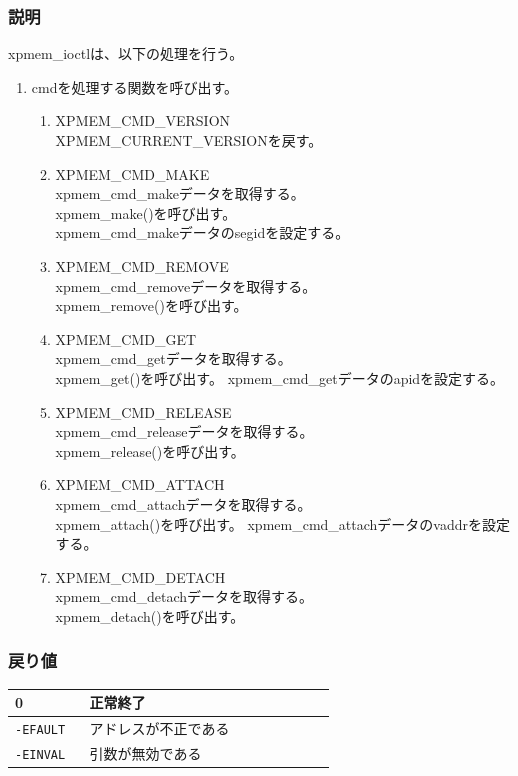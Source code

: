 \documentclass[twoside,11pt,fleqn]{book}
\begin{document}
\subsubsection*{説明}{\quad}
xpmem\_ioctlは、以下の処理を行う。
\begin{enumerate}
\item cmdを処理する関数を呼び出す。
  \begin{enumerate}
  \item XPMEM\_CMD\_VERSION\mbox{}\\
        XPMEM\_CURRENT\_VERSIONを戻す。
  \item XPMEM\_CMD\_MAKE\mbox{}\\
        xpmem\_cmd\_makeデータを取得する。\\
        xpmem\_make()を呼び出す。\\
        xpmem\_cmd\_makeデータのsegidを設定する。
  \item XPMEM\_CMD\_REMOVE\mbox{}\\
        xpmem\_cmd\_removeデータを取得する。\\
        xpmem\_remove()を呼び出す。
  \item XPMEM\_CMD\_GET\mbox{}\\
        xpmem\_cmd\_getデータを取得する。\\
        xpmem\_get()を呼び出す。
        xpmem\_cmd\_getデータのapidを設定する。
  \item XPMEM\_CMD\_RELEASE\mbox{}\\
        xpmem\_cmd\_releaseデータを取得する。\\
        xpmem\_release()を呼び出す。
  \item XPMEM\_CMD\_ATTACH\mbox{}\\
        xpmem\_cmd\_attachデータを取得する。\\
        xpmem\_attach()を呼び出す。
        xpmem\_cmd\_attachデータのvaddrを設定する。
  \item XPMEM\_CMD\_DETACH\mbox{}\\
        xpmem\_cmd\_detachデータを取得する。\\
        xpmem\_detach()を呼び出す。
  \end{enumerate}
\end{enumerate}

\subsubsection*{戻り値}{\quad}
\begin{table}[!h]
\footnotesize
\begin{tabular}{|p{0.20\linewidth}|p{0.66\linewidth}|} \hline
0&正常終了\\ \hline
\texttt{-EFAULT}&アドレスが不正である\\ \hline
\texttt{-EINVAL}&引数が無効である\\ \hline
\end{tabular}
\vspace{-0em}
\end{table}
\FloatBarrier
\end{document}
